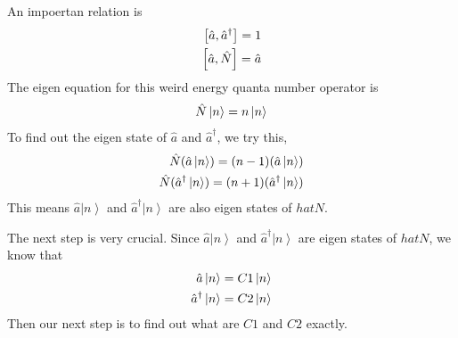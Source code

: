 \documentclass[letterpaper,10pt,english]{sphinxmanual}
\newcommand{\ket}[1]{\left| #1\right\rangle}
\begin{document}
An impoertan relation is
\begin{gather}
\begin{split}\left[\hat a, \hat a^\dagger\right] = 1 \\
\left[\hat a, \hat N\right] = \hat a\end{split}\notag
\end{gather}
The eigen equation for this weird energy quanta number operator is
\begin{gather}
\begin{split}\hat N \ket{n} = n \ket{n}\end{split}\notag
\end{gather}
To find out the eigen state of \(\hat a\) and \(\hat a^\dagger\), we try this,
\begin{gather}
\begin{split}\hat N (\hat a \ket{n}) = (n-1) (\hat a \ket{n})  \\
\hat N (\hat a^\dagger \ket{n}) = (n+1) (\hat a^\dagger \ket{n})\end{split}\notag
\end{gather}
This means \(\hat a \ket{n}\) and \(\hat a^\dagger \ket{n}\) are also eigen states of \(hat N\).

The next step is very crucial. Since \(\hat a \ket{n}\) and \(\hat a^\dagger \ket{n}\) are eigen states of \(hat N\), we know that
\begin{gather}
\begin{split}\hat a \ket{n} = C1 \ket{n} \\
\hat a^\dagger \ket{n} = C2 \ket{n}\end{split}\notag
\end{gather}
Then our next step is to find out what are \(C1\) and \(C2\) exactly.
\end{document}
